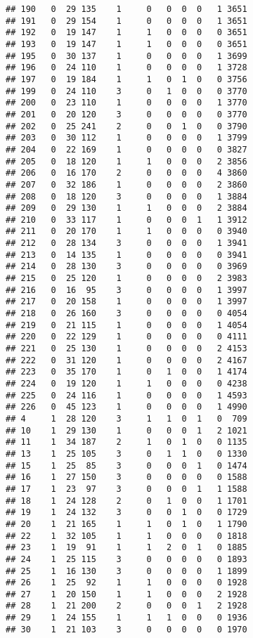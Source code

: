 \documentclass[]{book}
\begin{document}
\begin{verbatim}
## 190   0  29 135    1     0   0  0  0   1 3651
## 191   0  29 154    1     0   0  0  0   1 3651
## 192   0  19 147    1     1   0  0  0   0 3651
## 193   0  19 147    1     1   0  0  0   0 3651
## 195   0  30 137    1     0   0  0  0   1 3699
## 196   0  24 110    1     0   0  0  0   1 3728
## 197   0  19 184    1     1   0  1  0   0 3756
## 199   0  24 110    3     0   1  0  0   0 3770
## 200   0  23 110    1     0   0  0  0   1 3770
## 201   0  20 120    3     0   0  0  0   0 3770
## 202   0  25 241    2     0   0  1  0   0 3790
## 203   0  30 112    1     0   0  0  0   1 3799
## 204   0  22 169    1     0   0  0  0   0 3827
## 205   0  18 120    1     1   0  0  0   2 3856
## 206   0  16 170    2     0   0  0  0   4 3860
## 207   0  32 186    1     0   0  0  0   2 3860
## 208   0  18 120    3     0   0  0  0   1 3884
## 209   0  29 130    1     1   0  0  0   2 3884
## 210   0  33 117    1     0   0  0  1   1 3912
## 211   0  20 170    1     1   0  0  0   0 3940
## 212   0  28 134    3     0   0  0  0   1 3941
## 213   0  14 135    1     0   0  0  0   0 3941
## 214   0  28 130    3     0   0  0  0   0 3969
## 215   0  25 120    1     0   0  0  0   2 3983
## 216   0  16  95    3     0   0  0  0   1 3997
## 217   0  20 158    1     0   0  0  0   1 3997
## 218   0  26 160    3     0   0  0  0   0 4054
## 219   0  21 115    1     0   0  0  0   1 4054
## 220   0  22 129    1     0   0  0  0   0 4111
## 221   0  25 130    1     0   0  0  0   2 4153
## 222   0  31 120    1     0   0  0  0   2 4167
## 223   0  35 170    1     0   1  0  0   1 4174
## 224   0  19 120    1     1   0  0  0   0 4238
## 225   0  24 116    1     0   0  0  0   1 4593
## 226   0  45 123    1     0   0  0  0   1 4990
## 4     1  28 120    3     1   1  0  1   0  709
## 10    1  29 130    1     0   0  0  1   2 1021
## 11    1  34 187    2     1   0  1  0   0 1135
## 13    1  25 105    3     0   1  1  0   0 1330
## 15    1  25  85    3     0   0  0  1   0 1474
## 16    1  27 150    3     0   0  0  0   0 1588
## 17    1  23  97    3     0   0  0  1   1 1588
## 18    1  24 128    2     0   1  0  0   1 1701
## 19    1  24 132    3     0   0  1  0   0 1729
## 20    1  21 165    1     1   0  1  0   1 1790
## 22    1  32 105    1     1   0  0  0   0 1818
## 23    1  19  91    1     1   2  0  1   0 1885
## 24    1  25 115    3     0   0  0  0   0 1893
## 25    1  16 130    3     0   0  0  0   1 1899
## 26    1  25  92    1     1   0  0  0   0 1928
## 27    1  20 150    1     1   0  0  0   2 1928
## 28    1  21 200    2     0   0  0  1   2 1928
## 29    1  24 155    1     1   1  0  0   0 1936
## 30    1  21 103    3     0   0  0  0   0 1970

\end{verbatim}
\end{document}
